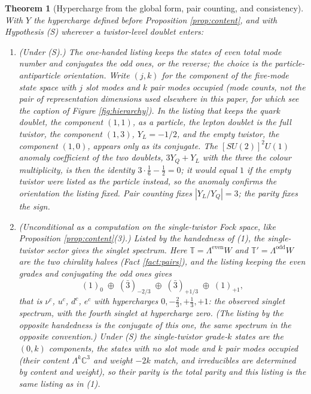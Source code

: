 \documentclass[11pt]{article}
\newtheorem{theorem}{Theorem}[section]
\theoremstyle{definition}
\newcommand{\C}{\mathbb{C}}
\newcommand{\T}{\mathbb{T}}
\begin{document}
\begin{theorem}[Hypercharge from the global form, pair counting, and consistency]\label{thm:hypercharge}
With $Y$ the hypercharge defined before Proposition \ref{prop:content}, and with Hypothesis (S) wherever a twistor-level doublet enters:
\begin{enumerate}
\item (Under (S).) The one-handed listing keeps the states of even total mode number and conjugates the odd ones, or the reverse; the choice is the particle-antiparticle orientation. Write $(j, k)$ for the component of the five-mode state space with $j$ slot modes and $k$ pair modes occupied (mode counts, not the pair of representation dimensions used elsewhere in this paper, for which see the caption of Figure \ref{fig:hierarchy}). In the listing that keeps the quark doublet, the component $(1,1)$, as a particle, the lepton doublet is the full twistor, the component $(1,3)$, $Y_{L} = -1/2$, and the empty twistor, the component $(1,0)$, appears only as its conjugate. The $[SU(2)]^{2}U(1)$ anomaly coefficient of the two doublets, $3Y_{Q} + Y_{L}$ with the three the colour multiplicity, is then the identity $3 \cdot \tfrac16 - \tfrac12 = 0$; it would equal $1$ if the empty twistor were listed as the particle instead, so the anomaly confirms the orientation the listing fixed. Pair counting fixes $|Y_{L}/Y_{Q}| = 3$; the parity fixes the sign.
\item (Unconditional as a computation on the single-twistor Fock space, like Proposition \ref{prop:content}(3).) Listed by the handedness of (1), the single-twistor sector gives the singlet spectrum. Here $\T = \Lambda^{\mathrm{even}}W$ and $\T' = \Lambda^{\mathrm{odd}}W$ are the two chirality halves (Fact \ref{fact:pairs}), and the listing keeping the even grades and conjugating the odd ones gives
\[
(1)_{0} \;\oplus\; (\bar{3})_{-2/3} \;\oplus\; (\bar{3})_{+1/3} \;\oplus\; (1)_{+1},
\]
that is $\nu^{c}$, $u^{c}$, $d^{c}$, $e^{c}$ with hypercharges $0, -\tfrac23, +\tfrac13, +1$: the observed singlet spectrum, with the fourth singlet at hypercharge zero. (The listing by the opposite handedness is the conjugate of this one, the same spectrum in the opposite convention.) Under (S) the single-twistor grade-$k$ states are the $(0, k)$ components, the states with no slot mode and $k$ pair modes occupied (their content $\Lambda^{k}\C^{3}$ and weight $-2k$ match, and irreducibles are determined by content and weight), so their parity is the total parity and this listing is the same listing as in (1).

\end{enumerate}
\end{theorem}
\end{document}
